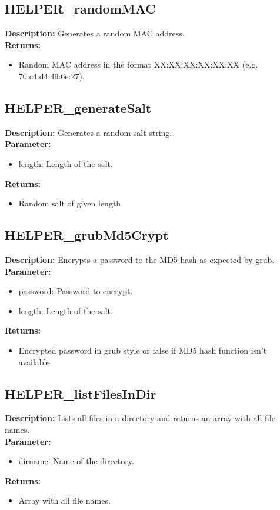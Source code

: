 \subsection{HELPER\_randomMAC}
\textbf{Description:} Generates a random MAC address.\\
\textbf{Returns:}
\begin{itemize}
\item Random MAC address in the format XX:XX:XX:XX:XX:XX (e.g. 70:c4:d4:49:6e:27).
\end{itemize}

\subsection{HELPER\_generateSalt}
\textbf{Description:} Generates a random salt string.\\
\textbf{Parameter:}
\begin{itemize}
\item length: Length of the salt.
\end{itemize}
\textbf{Returns:}
\begin{itemize}
\item Random salt of given length.
\end{itemize}

\subsection{HELPER\_grubMd5Crypt}
\textbf{Description:} Encrypts a password to the MD5 hash as expected by grub.\\
\textbf{Parameter:}
\begin{itemize}
\item password: Password to encrypt.
\item length: Length of the salt.
\end{itemize}
\textbf{Returns:}
\begin{itemize}
\item Encrypted password in grub style or false if MD5 hash function isn't available.
\end{itemize}

\subsection{HELPER\_listFilesInDir}
\textbf{Description:} Lists all files in a directory and returns an array with all file names.\\
\textbf{Parameter:}
\begin{itemize}
\item dirname: Name of the directory.
\end{itemize}
\textbf{Returns:}
\begin{itemize}
\item Array with all file names.
\end{itemize}


